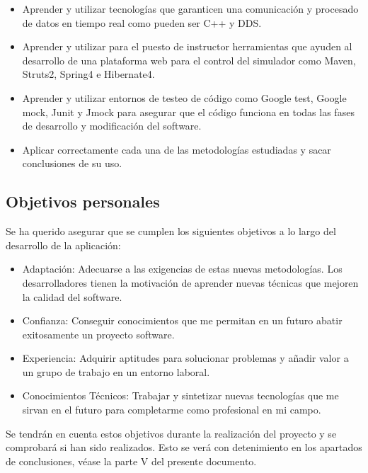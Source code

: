 \documentclass[12pt,a4paper,spanish]{book} %
\begin{document}
\begin{itemize}
  \item Aprender y utilizar tecnologías que garanticen una comunicación y procesado de datos en tiempo real como pueden ser C++ y DDS.
  
  \item Aprender y utilizar para el puesto de instructor herramientas que ayuden al desarrollo de una plataforma web para el control del simulador como Maven, Struts2, Spring4 e Hibernate4.
  
  \item Aprender y utilizar entornos de testeo de código como Google test, Google mock, Junit y Jmock para asegurar que el código funciona en todas las fases de desarrollo y modificación del software.

  \item Aplicar correctamente cada una de las metodologías estudiadas y sacar conclusiones de su uso.
  
\end{itemize}

\subsection{Objetivos personales}

Se ha querido asegurar que se cumplen los siguientes objetivos a lo largo del
desarrollo de la aplicación:

\begin{itemize}
  \item Adaptación: Adecuarse a las exigencias de estas nuevas metodologías. Los
  desarrolladores tienen la motivación de aprender nuevas técnicas que mejoren
  la calidad del software.
  
  \item Confianza: Conseguir conocimientos que me permitan en un futuro abatir exitosamente un proyecto software.
  
  \item Experiencia: Adquirir aptitudes para solucionar problemas y añadir valor a un grupo de trabajo en un entorno laboral.
  
  \item Conocimientos Técnicos: Trabajar y sintetizar nuevas tecnologías que me sirvan en el futuro para completarme como profesional en mi campo.

\end{itemize}
Se tendrán en cuenta estos objetivos durante la realización del proyecto y se comprobará si han sido realizados. Esto se verá con detenimiento en los apartados de conclusiones, véase la parte V del presente documento.
\end{document}
